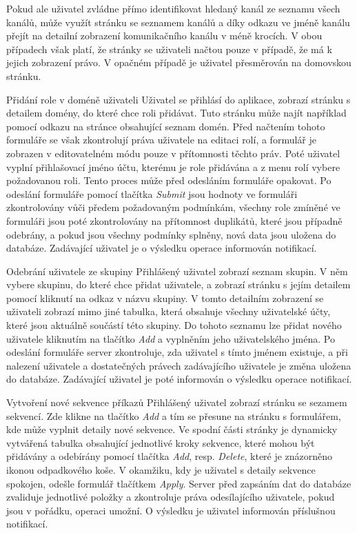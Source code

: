 \begin{enumfunctional}[style=nextline]
Pokud ale uživatel zvládne přímo identifikovat hledaný kanál ze seznamu všech kanálů, může využít stránku se seznamem kanálů a díky odkazu ve jméně kanálu přejít na detailní zobrazení komunikačního kanálu v méně krocích. V obou případech však platí, že stránky se uživateli načtou pouze v případě, že má k jejich zobrazení právo. V opačném případě je uživatel přesměrován na domovskou stránku.
\item[Přidání role v doméně uživateli]
Uživatel se přihlásí do aplikace, zobrazí stránku s detailem domény, do které chce roli přidávat. Tuto stránku může najít například pomocí odkazu na stránce obsahující seznam domén. Před načtením tohoto formuláře se však zkontrolují práva uživatele na editaci rolí, a formulář je zobrazen v editovatelném módu pouze v přítomnosti těchto práv. Poté uživatel vyplní přihlašovací jméno účtu, kterému je role přidávána a z menu rolí vybere požadovanou roli. Tento proces může před odesláním formuláře opakovat. Po odeslání formuláře pomocí tlačítka \emph{Submit} jsou hodnoty ve formuláři zkontrolovány vůči předem požadovaným podmínkám, všechny role zmíněné ve formuláři jsou poté zkontrolovány na přítomnost duplikátů, které jsou případně odebrány, a pokud jsou všechny podmínky splněny, nová data jsou uložena do databáze. Zadávající uživatel je o výsledku operace informován notifikací.
\item[Odebrání uživatele ze skupiny]
Přihlášený uživatel zobrazí seznam skupin. V něm vybere skupinu, do které chce přidat uživatele, a zobrazí stránku s jejím detailem pomocí kliknutí na odkaz v názvu skupiny. V tomto detailním zobrazení se uživateli zobrazí mimo jiné tabulka, která obsahuje všechny uživatelské účty, které jsou aktuálně součástí této skupiny. Do tohoto seznamu lze přidat nového uživatele kliknutím na tlačítko \emph{Add} a vyplněním jeho uživatelského jména. Po odeslání formuláře server zkontroluje, zda uživatel s tímto jménem existuje, a při nalezení uživatele a dostatečných právech zadávajícího uživatele je změna uložena do databáze. Zadávající uživatel je poté informován o výsledku operace notifikací.
\item[Vytvoření nové sekvence příkazů]
Přihlášený uživatel zobrazí stránku se sezamem sekvencí. Zde klikne na tlačítko \emph{Add} a tím se přesune na stránku s formulářem, kde může vyplnit detaily nové sekvence. Ve spodní části stránky je dynamicky vytvářená tabulka obsahující jednotlivé kroky sekvence, které mohou být přidávány a odebírány pomocí tlačítka \emph{Add}, resp. \emph{Delete}, které je znázorněno ikonou odpadkového koše. V okamžiku, kdy je uživatel s detaily sekvence spokojen, odešle formulář tlačítkem \emph{Apply}. Server před zapsáním dat do databáze zvaliduje jednotlivé položky a zkontroluje práva odesílajícího uživatele, pokud jsou v pořádku, operaci umožní. O výsledku je uživatel informován příslušnou notifikací.
\end{enumfunctional}


